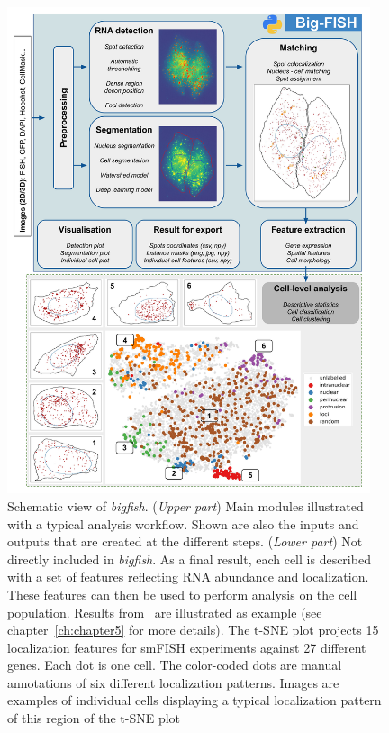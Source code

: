 \begin{figure}[]
    \centering
    \includegraphics[width=0.95\textwidth]{figures/chapter1/schema_bigfish_full}
    \caption{Schematic view of \emph{bigfish}.
	(\textit{Upper part}) Main modules illustrated with a typical analysis workflow.
	Shown are also the inputs and outputs that are created at the different steps.
	(\textit{Lower part}) Not directly included in \emph{bigfish}.
	As a final result, each cell is described with a set of features reflecting RNA abundance and localization.
	These features can then be used to perform analysis on the cell population.
	Results from~\cite{CHOUAIB_2020} are illustrated as example (see chapter~\ref{ch:chapter5} for more details).
	The t-SNE plot projects 15 localization features for smFISH experiments against 27 different genes.
	Each dot is one cell.
	The color-coded dots are manual annotations of six different localization patterns.
	Images are examples of individual cells displaying a typical localization pattern of this region of the t-SNE plot}
    \label{fig:bigfish}
\end{figure}

